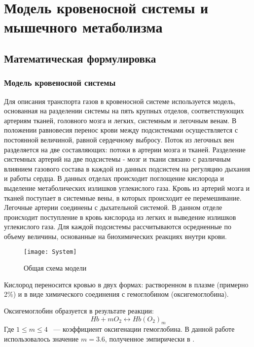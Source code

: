 \chapter{Модель кровеносной системы и мышечного метаболизма}
\label{chapt:blood_muscle}
\section{Математическая формулировка}
\subsection{Модель кровеносной системы}
Для описания транспорта газов в кровеносной системе используется модель, основанная на разделении системы на пять крупных отделов, соответствующих артериям тканей, головного мозга и легких, системным и легочным венам. В положении равновесия перенос крови между подсистемами осуществляется с постоянной величиной, равной сердечному выбросу. Поток из легочных вен разделяется на две составляющих: потоки в артерии мозга и тканей. Разделение системных артерий на две подсистемы - мозг и ткани связано с различным влиянием газового состава в каждой из данных подсистем на регуляцию дыхания и работы сердца. В данных отделах происходит поглощение кислорода и выделение метаболических излишков углекислого газа. Кровь из артерий мозга и тканей поступает в системные вены, в которых происходит ее перемешивание. Легочные артерии соединены с дыхательной системой. В данном отделе происходит поступление в кровь кислорода из легких и выведение излишков углекислого газа. Для каждой подсистемы рассчитываются осредненные по объему величины, основанные на биохимических реакциях внутри крови.  
  
\begin{figure}[!ht]
\centering
\texttt{[image: System]}
\caption{Общая схема модели } 
\label{systemChart}
\end{figure}

Кислород переносится кровью в двух формах: растворенном в плазме (примерно 2\%) и в виде химического соединения с гемоглобином (оксигемоглобина).

Оксигемоглобин образуется в результате реакции:
\begin{equation}
Hb+mO_{2} \longleftrightarrow Hb\left(O_{2} \right)_{m}
\label{o2hbreact}
\end{equation}
Где \( 1 \le m \le 4\) ~--- коэффициент оксигенации гемоглобина. В данной работе использовалось значение \( m = 3.6\), полученное эмпирически в \cite{guyton2000}. 

